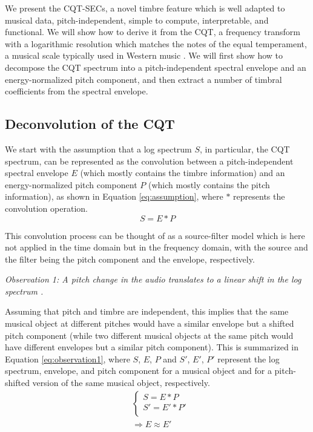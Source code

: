 \documentclass[journal]{IEEEtran}
\begin{document}
We present the CQT-SECs, a novel timbre feature which is well adapted to musical data, pitch-independent, simple to compute, interpretable, and functional. We will show how to derive it from the CQT, a frequency transform with a logarithmic resolution which matches the notes of the equal temperament, a musical scale typically used in Western music \cite{brown1991, brown1992}. We will first show how to decompose the CQT spectrum into a pitch-independent spectral envelope and an energy-normalized pitch component, and then extract a number of timbral coefficients from the spectral envelope. 

\subsection{Deconvolution of the CQT}

We start with the assumption that a log spectrum $S$, in particular, the CQT spectrum, can be represented as the convolution between a pitch-independent spectral envelope $E$ (which mostly contains the timbre information) and an energy-normalized pitch component $P$ (which mostly contains the pitch information), as shown in Equation \ref{eq:assumption}, where $*$ represents the convolution operation. 
\begin{equation}
\label{eq:assumption}
S = E * P
\end{equation}

This convolution process can be thought of as a source-filter model \cite{fant1970} which is here not applied in the time domain but in the frequency domain, with the source and the filter being the pitch component and the envelope, respectively.

\emph{Observation 1: A pitch change in the audio translates to a linear shift in the log spectrum \cite{brown1991, brown1992}.}

Assuming that pitch and timbre are independent, this implies that the same musical object at different pitches would have a similar envelope but a shifted pitch component (while two different musical objects at the same pitch would have different envelopes but a similar pitch component). This is summarized in Equation \ref{eq:observation1}, where $S$, $E$, $P$ and $S'$, $E'$, $P'$ represent the log spectrum, envelope, and pitch component for a musical object and for a pitch-shifted version of the same musical object, respectively.
\begin{equation}
\label{eq:observation1}
\begin{split}
& \begin{cases}
S = E * P \\
S' = E' * P' \\
\end{cases} \\
& \Rightarrow E \approx E'
\end{split}
\end{equation}
\end{document}
